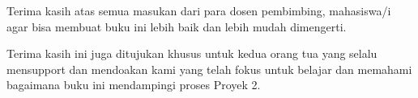 Terima kasih atas semua masukan dari para dosen pembimbing, mahasiswa/i agar bisa membuat buku ini 
lebih baik dan lebih mudah dimengerti.

Terima kasih ini juga ditujukan khusus untuk kedua orang tua yang selalu mensupport dan mendoakan kami yang 
telah fokus untuk belajar dan memahami bagaimana buku ini mendampingi proses Proyek 2.
